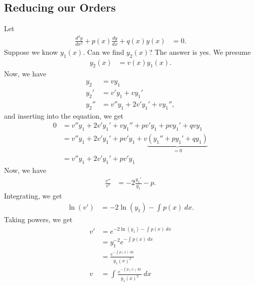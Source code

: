 \documentclass[10pt]{mypackage}
\begin{document}
\subsection{Reducing our Orders}%
Let
\begin{align*}
  \frac{d^2y}{dx^2} + p(x)\frac{dy}{dx} + q(x)y(x) &= 0.
\end{align*}
Suppose we know $y_1(x)$. Can we find $y_2(x)$? The answer is yes. We presume
\begin{align*}
  y_2(x) &= v(x)y_1(x).
\end{align*}
Now, we have
\begin{align*}
  y_2 &= vy_1\\
  y_2' &= v'y_1 + vy_1'\\
  y_2'' &= v''y_1 + 2v'y_1' + vy_1'',
\end{align*}
and inserting into the equation, we get
\begin{align*}
  0 &= v''y_1 + 2v'y_1' + vy_1'' + pv'y_1 + pvy_1' + qvy_1\\
    &= v''y_1 + 2v'y_1' + pv'y_1 + v\underbrace{\left(y_1'' + py_1' + qy_1\right)}_{=0}\\
    &= v''y_1 + 2v'y_1' + pv'y_1
\end{align*}
Now, we have
\begin{align*}
  \frac{v''}{v'} &= -2\frac{y_1'}{y_1} - p.\tag{\textasteriskcentered}
\end{align*}
Integrating, we get
\begin{align*}
  \ln\left(v'\right) &= -2\ln\left(y_1\right) - \int_{}^{} p(x)\:dx.
\end{align*}
Taking powers, we get
\begin{align*}
  v' &= e^{-2\ln\left(y_1\right) - \int_{}^{} p(x)\:dx}\\
     &= y_1^{-2} e^{-\int_{}^{} p(x)\:dx}\\
     &= \frac{e^{-\int_{}^{} p(x)\:dx}}{y_1(x)^2}\\
  v &= \int_{}^{} \frac{e^{-\int_{}^{} p(x)\:dx}}{y_1(x)^2}\:dx
\end{align*}
\end{document}
